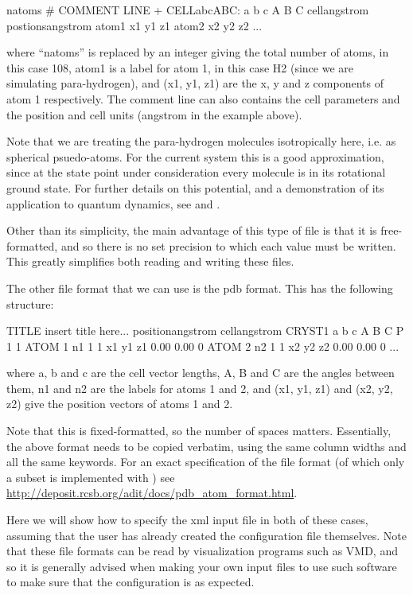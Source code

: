\documentclass[11pt,english,fleqn]{report}
\newenvironment{code}{%
\footnotesize
\verbatim
}{
\endverbatim
\normalsize
}
\begin{document}
\begin{code}
natoms
# COMMENT LINE + CELL{abcABC}: a b c A B C cell{angstrom} postions{angstrom}
atom1   x1  y1  z1
atom2   x2  y2  z2
...
\end{code}
where {}``natoms'' is replaced by an integer giving the total number
of atoms, in this case 108, atom1 is a label for atom 1, in this case
H2 (since we are simulating para-hydrogen), and (x1, y1, z1) are the
x, y and z components of atom 1 respectively. The comment line can
also contains the cell parameters and the position and cell units
(angstrom in the example above).

Note that we are treating the para-hydrogen molecules isotropically here,
i.e. as spherical psuedo-atoms.
For the current system this is a good approximation, since at
the state point under consideration every molecule is in its
rotational ground state. For further details on this potential,
and a demonstration of its application to quantum dynamics, see
\cite{silv-gold78jcp} and \cite{mill-mano05jcp}.

Other than its simplicity, the main advantage of this type of file
is that it is free-formatted, and so there is no set precision
to which each value must be written. This greatly simplifies
both reading and writing these files.

The other file format that we can use is the pdb format. This
has the following structure:

\begin{code}
TITLE insert title here... position{angstrom} cell{angstrom}
CRYST1        a        b        c      A      B      C P 1           1
ATOM      1   n1   1     1          x1      y1      z1  0.00  0.00             0
ATOM      2   n2   1     1          x2      y2      z2  0.00  0.00             0
...
\end{code}
where a, b and c are the cell vector lengths, A, B and C are the angles between
them, n1 and n2 are the labels for atoms 1 and 2, and (x1, y1, z1)
and (x2, y2, z2) give the position vectors of atoms 1 and 2.

Note that this is
fixed-formatted, so the number of spaces matters. Essentially, the
above format needs to be copied verbatim, using the same column
widths and all the same keywords. For an exact specification
of the file format (of which only a subset is implemented
with \ipi) see
\url{http://deposit.rcsb.org/adit/docs/pdb_atom_format.html}.

Here we will show how to specify the xml input file
in both of these cases, assuming that the user has already
created the configuration file themselves.
Note that these file formats can be read by
visualization programs such as VMD, and so it is generally advised
when making your own input files to
use such software to make sure that the configuration is as expected.
\end{document}
